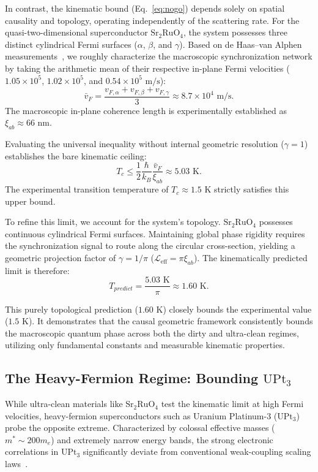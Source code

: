 \documentclass[11pt,a4paper]{article}
\begin{document}
In contrast, the kinematic bound (Eq.~\eqref{eq:nogo}) depends solely on spatial causality and topology, operating independently of the scattering rate. For the quasi-two-dimensional superconductor $\text{Sr}_2\text{RuO}_4$, the system possesses three distinct cylindrical Fermi surfaces ($\alpha$, $\beta$, and $\gamma$). Based on de Haas–van Alphen measurements~\cite{Mackenzie2003}, we roughly characterize the macroscopic synchronization network by taking the arithmetic mean of their respective in-plane Fermi velocities ($1.05 \times 10^5$, $1.02 \times 10^5$, and $0.54 \times 10^5 \text{ m/s}$):
\begin{equation}
\bar{v}_F = \frac{v_{F,\alpha} + v_{F,\beta} + v_{F,\gamma}}{3} \approx 8.7 \times 10^4 \text{ m/s}.
\end{equation}
The macroscopic in-plane coherence length is experimentally established as $\xi_{ab} \approx 66 \text{ nm}$.

Evaluating the universal inequality without internal geometric resolution ($\gamma = 1$) establishes the bare kinematic ceiling:
\begin{equation}
T_c \le \frac{1}{2}\frac{\hbar}{k_B}\frac{\bar{v}_F}{\xi_{ab}} \approx 5.03 \text{ K}.
\end{equation}
The experimental transition temperature of $T_c \approx 1.5 \text{ K}$ strictly satisfies this upper bound.

To refine this limit, we account for the system's topology. $\text{Sr}_2\text{RuO}_4$ possesses continuous cylindrical Fermi surfaces. Maintaining global phase rigidity requires the synchronization signal to route along the circular cross-section, yielding a geometric projection factor of $\gamma = 1/\pi$ ($\mathcal{L}_{\text{eff}} = \pi \xi_{ab}$). The kinematically predicted limit is therefore:
\begin{equation}
T_{predict} = \frac{5.03 \text{ K}}{\pi} \approx 1.60 \text{ K}.
\end{equation}

This purely topological prediction ($1.60 \text{ K}$) closely bounds the experimental value ($1.5 \text{ K}$). It demonstrates that the causal geometric framework consistently bounds the macroscopic quantum phase across both the dirty and ultra-clean regimes, utilizing only fundamental constants and measurable kinematic properties.

\subsection*{The Heavy-Fermion Regime: Bounding $\text{UPt}_3$}
While ultra-clean materials like $\text{Sr}_2\text{RuO}_4$ test the kinematic limit at high Fermi velocities, heavy-fermion superconductors such as Uranium Platinum-3 ($\text{UPt}_3$) probe the opposite extreme. Characterized by colossal effective masses ($m^* \sim 200 m_e$) and extremely narrow energy bands, the strong electronic correlations in $\text{UPt}_3$ significantly deviate from conventional weak-coupling scaling laws~\cite{Stewart1984}.
\end{document}
